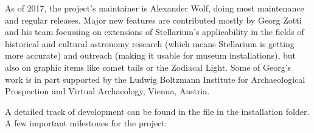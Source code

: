 As of 2017, the project's maintainer is Alexander Wolf, doing most
maintenance and regular releases. Major new features are contributed
mostly by Georg Zotti and his team focussing on extensions of
Stellarium's applicability in the fields of historical and cultural
astronomy research (which means Stellarium is getting more accurate)
and outreach (making it usable for museum installations), but also on
graphic items like comet tails or the Zodiacal Light. Some of Georg's work is
in part supported by the Ludwig Boltzmann Institute for Archaeological
Prospection and Virtual Archaeology, Vienna, Austria.

\vspace{1\baselineskip}
\noindent A detailed track of development can be found in the
 file in the installation folder. A few important
milestones for the project:
